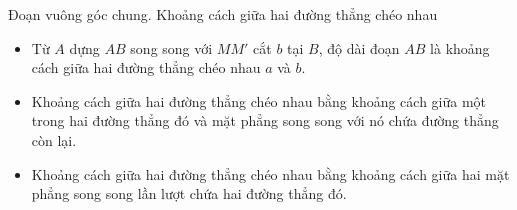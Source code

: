 \begin{dang}{Đoạn vuông góc chung. Khoảng cách giữa hai đường thẳng chéo nhau}
\begin{itemize}
{
		}
		\begin{itemize}
		\item [$\bullet$] Từ $A$ dựng $AB$ song song với $MM'$ cắt $b$ tại $B$, độ dài đoạn $AB$ là khoảng cách giữa hai đường thẳng chéo nhau $a$ và $b$.
	\end{itemize}
	\end{itemize}
	\begin{note}
		\begin{itemize}
			\item Khoảng cách giữa hai đường thẳng chéo nhau bằng khoảng cách giữa một trong hai đường thẳng đó và mặt phẳng song song với nó chứa đường thẳng còn lại.
			\item Khoảng cách giữa hai đường thẳng chéo nhau bằng khoảng cách giữa hai mặt phẳng song song lần lượt chứa hai đường thẳng đó.
		\end{itemize}
	\end{note}
\end{dang}

